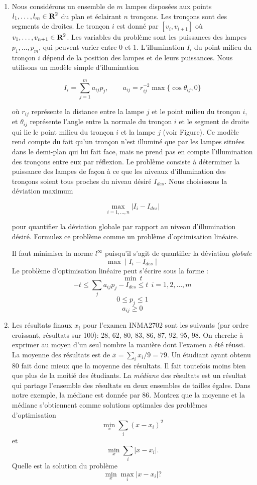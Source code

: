 \begin{enumerate}
  \item Nous considérons un ensemble de $m$ lampes disposées aux points $l_1, \ldots, l_m \in {\mbox{\bf R}}^2$ du plan et éclairant $n$
    tronçons. Les tronçons sont des segments de droites. Le tronçon $i$ est donné par $[v_i, v_{i+1}]$ où $v_1, \ldots, v_{n+1}
    \in {\mbox{\bf R}}^2$.  Les variables du problème sont les puissances des lampes $p_1, \ldots, p_m$, qui peuvent varier entre 0 et 1.
    L'illumination $I_i$ du point milieu du tronçon $i$ dépend de la position des lampes et de leurs
    puissances. Nous utilisons un modèle simple d'illumination

    $$I_i = \sum_{j=1}^m a_{ij} p_j, \qquad a_{ij}=r_{ij}^{-2} \max \{\cos \theta_{ij}, 0 \}$$

    où $r_{ij}$ représente la distance entre la lampe $j$ et le point milieu du tronçon $i$, et $\theta_{ij}$ représente l'angle
    entre la normale du tronçon $i$ et le segment de droite qui lie le point milieu du tronçon $i$ et la lampe $j$ (voir Figure). Ce
    modèle rend compte du fait qu'un tronçon n'est illuminé que par les lampes situées dans le demi-plan qui lui fait face,
    mais ne prend pas en compte l'illumination des tronçons entre eux par réflexion.  Le problème consiste à déterminer la puissance des lampes de façon à ce
    que les niveaux d'illumination des  tronçons soient tous proches du niveau désiré $I_{des}$. Nous choisissons la déviation maximum

    $$\max_{i=1, \ldots, n} | I_i -I_{des}|$$

    pour quantifier la déviation globale par rapport au niveau d'illumination désiré. Formulez ce problème comme un problème d'optimisation linéaire.

    \begin{solution}
      Il faut minimiser la norme $l^{\infty}$ puisqu'il s'agit de quantifier la déviation \textit{globale} 
      $$ \max \mid I_{i} - I_{des} \mid $$ 
      Le problème d'optimisation linéaire peut s'écrire sous la forme : 
      $$\min ~t$$
      $$ -t \le \sum_{j}a_{ij}p_{j} - I_{des} \le t ~~i = 1, 2, \dots, m $$
      $$ 0 \le p_{j} \le 1$$
      $$a_{ij} \geq 0$$
    \end{solution}



  \item Les résultats finaux $x_i$ pour l'examen INMA2702 sont les suivants (par ordre croissant, résultats sur 100): 28, 62, 80,
    83, 86, 87,  92, 95, 98. On cherche à exprimer au moyen d'un seul nombre la manière dont l'examen a été réussi. La moyenne des résultats
    est de
    $\overline x = \sum_i x_i /9 = 79$. Un étudiant ayant
    obtenu 80 fait donc mieux que la moyenne des résultats. Il fait toutefois moins bien que plus de la moitié des étudiants. La
    \emph{médiane}  des résultats est un résultat qui partage l'ensemble des résultats en deux ensembles de  tailles égales. Dans notre
    exemple, la médiane est donnée par $86$. Montrez que la moyenne et la médiane s'obtiennent comme solutions optimales des problèmes
    d'optimisation
    $$\min_x \sum_i (x-x_i)^2$$
    et
    $$\min_x \sum_i |x-x_i|.$$
    Quelle est la solution du problème
    $$\min_x \max_i | x-x_i| ?$$


\end{enumerate}
